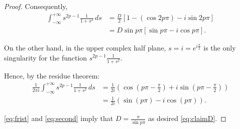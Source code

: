 \documentclass{article}
\numberwithin{equation}{section}
\begin{document}
\begin{proof}
Consequently,
\begin{align}
    \int_{-\infty}^{+\infty} s^{2p-1} \frac{1}{1+s^2} \, ds &= \frac{D}{2} \left[ 1 - (\cos 2p\pi) - i \sin 2p\pi \right] \nonumber\\
    &= D \sin p\pi \left[ \sin p\pi - i \cos p\pi \right].\label{eq:frist}
\end{align}

On the other hand, in the upper complex half plane, $s = i = e^{i\frac{\pi}{2}}$ is the only singularity for the function $s^{2p-1} \frac{1}{1+s^2}$.

Hence, by the residue theorem:
\begin{align}
    \frac{1}{2\pi i} \int_{-\infty}^{+\infty} s^{2p-1} \frac{1}{1+s^2} \, ds &= \frac{1}{2i} \left( \cos(p\pi - \frac{\pi}{2}) + i \sin(p\pi - \frac{\pi}{2}) \right) \nonumber\\
    &= \frac{1}{2i} \left( \sin(p\pi) - i \cos(p\pi) \right). \label{eq:second}
\end{align}

\eqref{eq:frist} and \eqref{eq:second} imply that $D = \frac{\pi}{\sin p\pi}$ as desired \eqref{eq:claimD}.
\end{proof}

\end{document}
